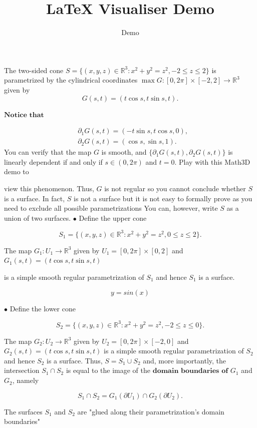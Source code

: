 \documentclass{article}
\newenvironment{viz}[1][]{\begin{equation}}{\end{equation}}
\begin{document}
\title{LaTeX Visualiser Demo}
\author{Demo}
\date{}


The two-sided cone $S=\{(x,y,z)\in\mathbb{R}^3:x^2+y^2=z^2,-2\leq z\leq2\}$ is parametrized by the cylindrical coordinates $\max G:[0,2\pi]\times[-2,2]\to\mathbb{R}^3$ given by
$$G(s,t)=(t\cos s,t\sin s,t).$$

$\textbf{Notice that}$

$$\begin{aligned}&\partial_1G(s,t)=(-t\sin s,t\cos s,0),\\&\partial_2G(s,t)=(\cos s,\sin s,1).\end{aligned}$$
You can verify that the map $G$ is smooth, and $\{\partial_1G(s,t),\partial_2G(s,t)\}$ is linearly dependent if and only if $s\in(0,2\pi)$ and $t=0.$ Play with this Math3D demo to



view this phenomenon.
Thus, $G$ is not regular so you cannot conclude whether $S$ is a surface. In fact, $S$ is not a surface but it is not easy to formally prove as you need to exclude all possible parametrizations You can, however, write $S$ as a union of two surfaces.
$\bullet$ Define the upper cone

$$S_1=\{(x,y,z)\in\mathbb{R}^3:x^2+y^2=z^2,0\leq z\leq2\}.$$

The map $G_1:U_1\to\mathbb{R}^3$ given by $U_1=[0,2\pi]\times[0,2]$ and $G_1(s,t)=(t\cos s,t\sin s,t)$

is a simple smooth regular parametrization of $S_1$ and hence $S_1$ is a surface.

\begin{viz}[type=curve, label=AI Suggested Curve, xrange=-6:6, yrange=-2:2]
y = sin(x)
\end{viz}

$\bullet$ Define the lower cone

$$S_2=\{(x,y,z)\in\mathbb{R}^3:x^2+y^2=z^2,-2\leq z\leq0\}.$$

The map $G_2:U_2\to\mathbb{R}^3$ given by $U_2=[0,2\pi]\times[-2,0]$ and $G_2(s,t)=(t\cos s,t\sin s,t)$
is a simple smooth regular parametrization of $S_2$ and hence $S_2$ is a surface.
Thus, $S=S_1\cup S_2$ and, more importantly, the intersection $S_1\cap S_2$ is equal to the image of the
$\textbf{domain boundaries of }G_1$ and $G_2$, namely

$$S_1\cap S_2=G_1(\partial U_1)\cap G_2(\partial U_2).$$

The surfaces $S_1$ and $S_2$ are "glued along their parametrization's domain boundaries"

\end{document}

